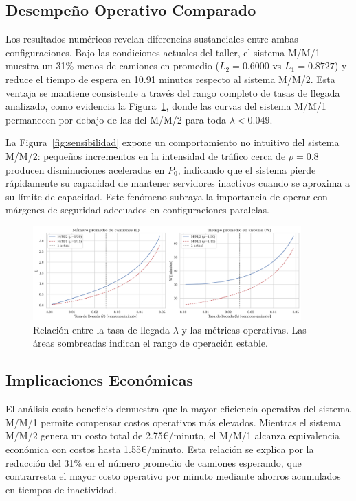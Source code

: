 \documentclass[12pt, a4paper]{article}
\begin{document}
    \subsection{Desempeño Operativo Comparado}
    Los resultados numéricos revelan diferencias sustanciales entre ambas configuraciones. Bajo las condiciones actuales del taller, el sistema M/M/1 muestra un 31\% menos de camiones en promedio ($L_2 = 0.6000$ vs $L_1 = 0.8727$) y reduce el tiempo de espera en 10.91 minutos respecto al sistema M/M/2. Esta ventaja se mantiene consistente a través del rango completo de tasas de llegada analizado, como evidencia la Figura~\ref{fig:comparacion}, donde las curvas del sistema M/M/1 permanecen por debajo de las del M/M/2 para toda $\lambda < 0.049$.
    
    La Figura~\ref{fig:sensibilidad} expone un comportamiento no intuitivo del sistema M/M/2: pequeños incrementos en la intensidad de tráfico cerca de $\rho = 0.8$ producen disminuciones aceleradas en $P_0$, indicando que el sistema pierde rápidamente su capacidad de mantener servidores inactivos cuando se aproxima a su límite de capacidad. Este fenómeno subraya la importancia de operar con márgenes de seguridad adecuados en configuraciones paralelas.
    
    \begin{figure}[H]
    	\centering
    	\includegraphics[width=0.92\textwidth]{figures/comparacion_sistemas.png}
    	\caption{Relación entre la tasa de llegada $\lambda$ y las métricas operativas. Las áreas sombreadas indican el rango de operación estable.}
    	\label{fig:comparacion}
    \end{figure}
    
    \subsection{Implicaciones Económicas}
    El análisis costo-beneficio demuestra que la mayor eficiencia operativa del sistema M/M/1 permite compensar costos operativos más elevados. Mientras el sistema M/M/2 genera un costo total de 2.75€/minuto, el M/M/1 alcanza equivalencia económica con costos hasta 1.55€/minuto. Esta relación se explica por la reducción del 31\% en el número promedio de camiones esperando, que contrarresta el mayor costo operativo por minuto mediante ahorros acumulados en tiempos de inactividad.
    
\end{document}
